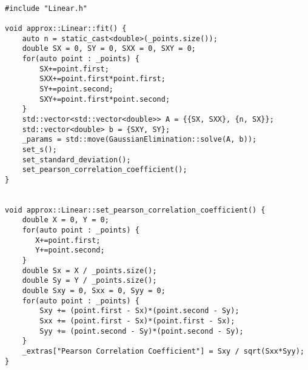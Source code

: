 \begin{lstlisting}

#include "Linear.h"

void approx::Linear::fit() {
    auto n = static_cast<double>(_points.size());
    double SX = 0, SY = 0, SXX = 0, SXY = 0;
    for(auto point : _points) {
        SX+=point.first;
        SXX+=point.first*point.first;
        SY+=point.second;
        SXY+=point.first*point.second;
    }
    std::vector<std::vector<double>> A = {{SX, SXX}, {n, SX}};
    std::vector<double> b = {SXY, SY};
    _params = std::move(GaussianElimination::solve(A, b));
    set_s();
    set_standard_deviation();
    set_pearson_correlation_coefficient();
}


void approx::Linear::set_pearson_correlation_coefficient() {
    double X = 0, Y = 0;
    for(auto point : _points) {
       X+=point.first;
       Y+=point.second;
    }
    double Sx = X / _points.size();
    double Sy = Y / _points.size();
    double Sxy = 0, Sxx = 0, Syy = 0;
    for(auto point : _points) {
        Sxy += (point.first - Sx)*(point.second - Sy);
        Sxx += (point.first - Sx)*(point.first - Sx);
        Syy += (point.second - Sy)*(point.second - Sy);
    }
    _extras["Pearson Correlation Coefficient"] = Sxy / sqrt(Sxx*Syy);
}











\end{lstlisting}